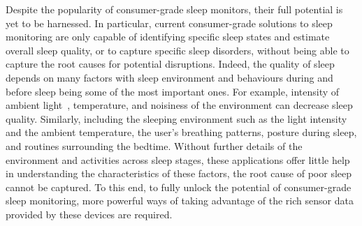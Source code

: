Despite the popularity of consumer-grade sleep monitors, their full potential is yet to be harnessed. In particular, current consumer-grade solutions to sleep monitoring are only capable of identifying specific sleep states and estimate overall sleep quality, or to capture specific sleep disorders, without being able to capture the root causes for potential disruptions. Indeed, the quality of sleep depends on many factors with sleep environment and behaviours during and before sleep being some of the most important ones. For example, intensity of ambient light~\cite{hood04determinants}, temperature, and noisiness of the environment can decrease sleep quality. Similarly, including the sleeping environment such as the light intensity and the ambient temperature, the user's breathing patterns, posture during sleep, and routines surrounding the bedtime. Without further details of the environment and activities across sleep stages, these applications offer little help in
understanding the characteristics of these factors, the root cause of poor sleep cannot be captured. To this end, to fully unlock the potential of consumer-grade sleep monitoring, more powerful ways of taking advantage of the rich sensor data provided by these devices are required.










